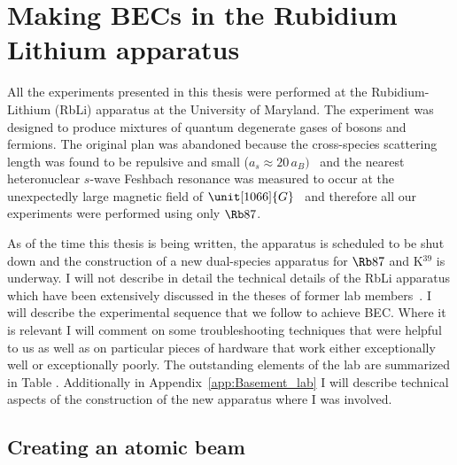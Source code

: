 


\renewcommand{\thechapter}{4}


\chapter{Making BECs in the Rubidium Lithium apparatus}

All the experiments presented in this thesis were performed at the Rubidium-Lithium (RbLi) apparatus at the University of Maryland. The experiment was designed to produce mixtures of quantum degenerate gases of bosons and fermions. The original plan was abandoned because the cross-species scattering length was found to be repulsive and small ($a_s\approx20\,a_B)$~\cite{silber_quantum-degenerate_2005} and the nearest heteronuclear $s$-wave Feshbach resonance was measured to occur at the unexpectedly large magnetic field of $\unit[1066]{G}$~\cite{deh_feshbach_2008} and therefore all our experiments were performed using only $\Rb87$.

As of the time this thesis is being written, the apparatus is scheduled to be shut down and the construction of a new dual-species apparatus for $\Rb87$ and K$^{39}$ is underway. I will not describe in detail the technical details of the RbLi apparatus which have been extensively discussed in the theses of former lab members~\cite{CampbellThesis,PriceThesis}. I will describe the experimental sequence that we follow to achieve BEC. Where it is relevant I will comment on some troubleshooting techniques that were helpful to us as well as on particular pieces of hardware that work either exceptionally well or exceptionally poorly. The outstanding elements of the lab are summarized in Table . Additionally in Appendix~\ref{app:Basement_lab} I will describe technical aspects of the construction of the new apparatus where I was involved. 
 \cite{PriceThesis,CampbellThesis}

\section{Creating an atomic beam}

